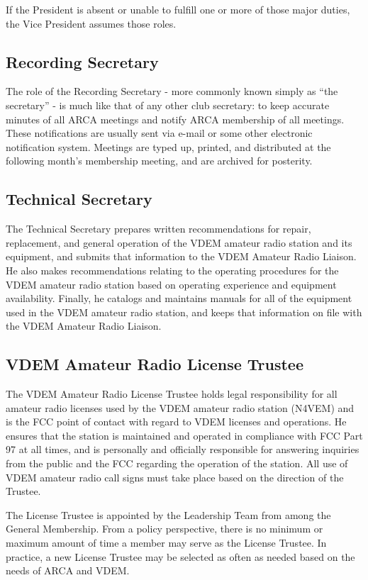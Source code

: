 \documentclass[pdflatex,letterpaper,twoside,12pt]{book}
\begin{document}
If the President is absent or unable to fulfill one or more of those major duties, the Vice President assumes those roles.

\subsection{Recording Secretary}

The role of the Recording Secretary - more commonly known simply as “the secretary” - is much like that of any other club secretary:  to keep accurate minutes of all ARCA meetings and notify ARCA membership of all meetings.  These notifications are usually sent via e-mail or some other electronic notification system.  Meetings are typed up, printed, and distributed at the following month's membership meeting, and are archived for posterity.

\subsection{Technical Secretary}

The Technical Secretary prepares written recommendations for repair, replacement, and general operation of the VDEM amateur radio station and its equipment, and submits that information to the VDEM Amateur Radio Liaison.  He also makes recommendations relating to the operating procedures for the VDEM amateur radio station based on operating experience and equipment availability.  Finally, he catalogs and maintains manuals for all of the equipment used in the VDEM amateur radio station, and keeps that information on file with the VDEM Amateur Radio Liaison.

\subsection{VDEM Amateur Radio License Trustee}

The VDEM Amateur Radio License Trustee holds legal responsibility for all amateur radio licenses used by the VDEM amateur radio station (N4VEM) and is the FCC point of contact with regard to VDEM licenses and operations.  He ensures that the station is maintained and operated in compliance with FCC Part 97 at all times, and is personally and officially responsible for answering inquiries from the public and the FCC regarding the operation of the station.  All use of VDEM amateur radio call signs must take place based on the direction of the Trustee.

The License Trustee is appointed by the Leadership Team from among the General Membership.  From a policy perspective, there is no minimum or maximum amount of time a member may serve as the License Trustee.  In practice, a new License Trustee may be selected as often as needed based on the needs of ARCA and VDEM.
\end{document}
